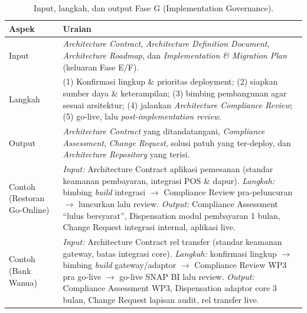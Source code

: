 \begin{table}[htbp]
\centering
\scriptsize
\caption{Input, langkah, dan output Fase G (Implementation Governance).}
\label{tab:io-fase-g}
\begin{tabularx}{\textwidth}{@{}p{} X@{}}
\hline
\textbf{Aspek} & \textbf{Uraian} \\
\hline
Input & \emph{Architecture Contract}, \emph{Architecture Definition Document},
\emph{Architecture Roadmap}, dan \emph{Implementation \& Migration Plan} (keluaran
Fase E/F). \\
Langkah & (1) Konfirmasi lingkup \& prioritas deployment; (2) siapkan sumber daya
\& keterampilan; (3) bimbing pembangunan agar sesuai arsitektur; (4) jalankan
\emph{Architecture Compliance Review}; (5) go-live, lalu \emph{post-implementation
review}. \\
Output & \emph{Architecture Contract} yang ditandatangani, \emph{Compliance
Assessment}, \emph{Change Request}, solusi patuh yang ter-deploy, dan
\emph{Architecture Repository} yang terisi. \\
Contoh (Restoran Go-Online) & \emph{Input:} Architecture Contract aplikasi pemesanan
(standar keamanan pembayaran, integrasi POS \& dapur). \emph{Langkah:} bimbing
\emph{build} integrasi $\rightarrow$ Compliance Review pra-peluncuran $\rightarrow$
luncurkan lalu review. \emph{Output:} Compliance Assessment ``lulus bersyarat'',
Dispensation modul pembayaran 1 bulan, Change Request integrasi internal, aplikasi
live. \\
Contoh (Bank Wanua) & \emph{Input:} Architecture Contract rel transfer (standar
keamanan gateway, batas integrasi core). \emph{Langkah:} konfirmasi lingkup
$\rightarrow$ bimbing \emph{build} gateway/adaptor $\rightarrow$ Compliance Review
WP3 pra go-live $\rightarrow$ go-live SNAP BI lalu review. \emph{Output:} Compliance
Assessment WP3, Dispensation adaptor core 3 bulan, Change Request lapisan audit, rel
transfer live. \\
\hline
\end{tabularx}
\end{table}

